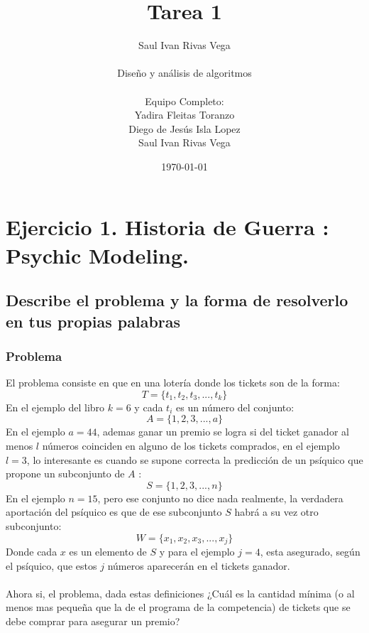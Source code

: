 \documentclass[12pt]{article}
\title{Tarea 1}
\author{
	Saul Ivan Rivas Vega \\
	\\
	Diseño y análisis de algoritmos\\
\\
	Equipo Completo:\\
		Yadira Fleitas Toranzo\\
		Diego de Jesús Isla Lopez\\
		Saul Ivan Rivas Vega\\
}
\date{\today}
\begin{document}
	\maketitle
	\pagebreak
	\section{Ejercicio 1. Historia de Guerra : Psychic Modeling.}
	\subsection{Describe el problema y la forma de resolverlo en tus propias palabras}
	\subsubsection{Problema}
	El problema consiste en que en una lotería donde los tickets son de la forma:
	\begin{equation}\label{k_ticket}
	T = \{t_{1}, t_{2}, t_{3}, ..., t_{k}\} 
	\end{equation}
	En el ejemplo del libro $k=6$ y cada $t_{i}$ es un número del conjunto: \begin{equation}\label{t_fullset}
	A = \{1, 2, 3, ..., a\} 
	\end{equation}
	En el ejemplo $ a = 44$, ademas ganar un premio se logra si del ticket ganador al menos $l$ números coinciden en alguno de los tickets comprados, en el ejemplo $l=3$, lo interesante es cuando se supone correcta la predicción de un psíquico que propone un subconjunto de $A$ :
	\begin{equation}\label{n_set}
	S = \{1, 2, 3, ..., n\} 
	\end{equation}
	En el ejemplo $n=15$, pero ese conjunto no dice nada realmente, la verdadera aportación del psíquico es que de ese subconjunto $S$ habrá a su vez otro subconjunto:
	\begin{equation}\label{s_set}
	W= \{x_{1}, x_{2}, x_{3}, ..., x_{j}\} 
	\end{equation}
	Donde cada $x$ es un elemento de $S$ y para el ejemplo $j = 4$,  esta asegurado, según el psíquico, que estos $j$ números aparecerán en el tickets ganador.
	\paragraph{}
	Ahora si, el problema, dada estas definiciones ¿Cuál es la cantidad mínima (o al menos mas pequeña que la de el programa de la competencia) de tickets que se debe comprar para asegurar un premio?
\end{document}
